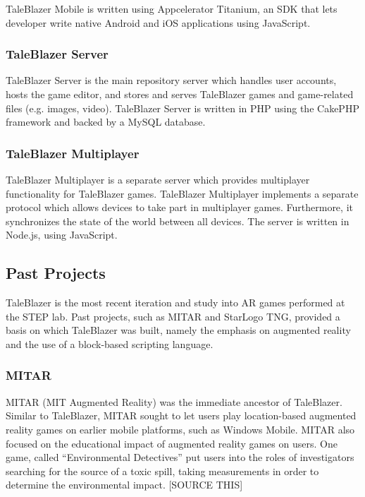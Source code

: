 TaleBlazer Mobile is written using Appcelerator Titanium, an SDK that lets developer write native Android and iOS applications using JavaScript. 

\subsubsection{TaleBlazer Server}

TaleBlazer Server is the main repository server which handles user accounts, hosts the game editor, and stores and serves TaleBlazer games and game-related files (e.g. images, video). TaleBlazer Server is written in PHP using the CakePHP framework and backed by a MySQL database. 

\subsubsection{TaleBlazer Multiplayer}

TaleBlazer Multiplayer is a separate server which provides multiplayer functionality for TaleBlazer games. TaleBlazer Multiplayer implements a separate protocol which allows devices to take part in multiplayer games. Furthermore, it synchronizes the state of the world between all devices. The server is written in Node.js, using JavaScript.

\subsection{Past Projects}

TaleBlazer is the most recent iteration and study into AR games performed at the STEP lab. Past projects, such as MITAR and StarLogo TNG, provided a basis on which TaleBlazer was built, namely the emphasis on augmented reality and the use of a block-based scripting language.

\subsubsection{MITAR}

MITAR (MIT Augmented Reality) was the immediate ancestor of TaleBlazer. Similar to TaleBlazer, MITAR sought to let users play location-based augmented reality games on earlier mobile platforms, such as Windows Mobile. MITAR also focused on the educational impact of augmented reality games on users. One game, called ``Environmental Detectives'' put users into the roles of investigators searching for the source of a toxic spill, taking measurements in order to determine the environmental impact. [SOURCE THIS]

